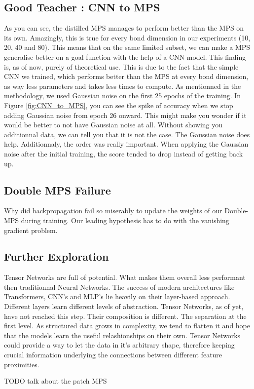\documentclass{article}
\theoremstyle{definition}
\theoremstyle{definition}
\begin{document}
\subsection{Good Teacher : CNN to MPS}
As you can see, the distilled MPS manages to perform better than the MPS on its own. Amazingly, this is true for every bond dimension in our experiments (10, 20, 40 and 80). This means that on the same limited subset, we can make a MPS generalise better on a goal function with the help of a CNN model. This finding is, as of now, purely of theoretical use. This is due to the fact that the simple CNN we trained, which performs better than the MPS at every bond dimension, as way less parameters and takes less times to compute. As mentionned in the methodology, we used Gaussian noise on the first 25 epochs of the training. In Figure \ref{fig:CNN_to_MPS}, you can see the spike of accuracy when we stop adding Gaussian noise from epoch 26 onward. This might make you wonder if it would be better to not have Gaussian noise at all. Without showing you additionnal data, we can tell you that it is not the case. The Gaussian noise does help. Additionnaly, the order was really important. When applying the Gaussian noise after the initial training, the score tended to drop instead of getting back up.



\subsection{Double MPS Failure}
Why did backpropagation fail so miserably to update the weights of our Double-MPS during training. Our leading hypothesis has to do with the vanishing gradient problem. 


\subsection{Further Exploration}
Tensor Networks are full of potential. What makes them overall less performant then traditionnal Neural Networks. The success of modern architectures like Transformers, CNN's and MLP's lie heavily on their layer-based approach. Different layers learn different levels of abstraction. Tensor Networks, as of yet, have not reached this step. Their composition is different. The separation at the first level. As structured data grows in complexity, we tend to flatten it and hope that the models learn the useful relashionships on their own. Tensor Networks could provide a way to let the data in it's arbitrary shape, therefore keeping crucial information underlying the connections between different feature proximities.




TODO talk about the patch MPS

\printbibliography
\end{document}
